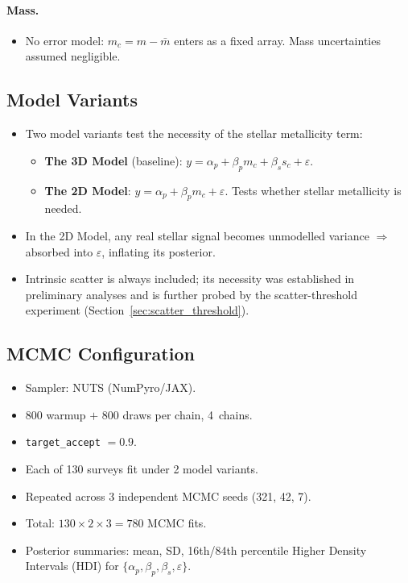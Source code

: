 \documentclass[twocolumn]{aastex631}
\begin{document}
\paragraph{Mass.}
\begin{itemize}
    \item No error model: $m_c = m - \bar{m}$ enters as a fixed
          array. Mass uncertainties assumed negligible.
\end{itemize}

\subsection{Model Variants}\label{sec:variants}

\begin{itemize}
    \item Two model variants test the necessity of the stellar
          metallicity term:
    \begin{itemize}
        \item \textbf{The 3D Model} (baseline):
              $y = \alpha_p + \beta_p m_c + \beta_s s_c + \varepsilon$.
        \item \textbf{The 2D Model}:
              $y = \alpha_p + \beta_p m_c + \varepsilon$.
              Tests whether stellar metallicity is needed.
    \end{itemize}
    \item In the 2D Model, any real stellar signal becomes
          unmodelled variance $\Rightarrow$ absorbed into
          $\varepsilon$, inflating its posterior.
    \item Intrinsic scatter is always included; its necessity was
          established in preliminary analyses and is further probed by
          the scatter-threshold experiment
          (Section~\ref{sec:scatter_threshold}).
\end{itemize}

\subsection{MCMC Configuration}\label{sec:mcmc}

\begin{itemize}
    \item Sampler: NUTS (NumPyro/JAX).
    \item 800 warmup $+$ 800 draws per chain, 4~chains.
    \item \texttt{target\_accept} $= 0.9$.
    \item Each of 130 surveys fit under 2 model variants.
    \item Repeated across 3 independent MCMC seeds (321, 42, 7).
    \item Total: $130 \times 2 \times 3 = 780$ MCMC fits.
    \item Posterior summaries: mean, SD, 16th/84th percentile Higher
          Density Intervals (HDI) for
          $\{\alpha_p, \beta_p, \beta_s, \varepsilon\}$.
\end{itemize}
\end{document}
